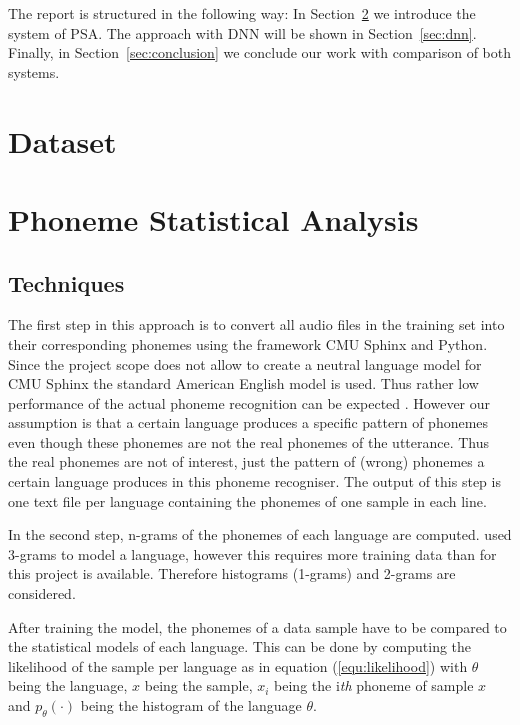 \documentclass{article}
\begin{document}
The report is structured in the following way: In Section~\ref{sec:psa} we introduce the system of PSA. The approach with DNN will be shown in Section~\ref{sec:dnn}. Finally, in Section~\ref{sec:conclusion} we conclude our work with comparison of both systems. 

\section{Dataset}
\label{sec:dataset}

\section{Phoneme Statistical Analysis}
\label{sec:psa}
\subsection{Techniques}
The first step in this approach is to convert all audio files in the training set into their corresponding phonemes using the framework CMU Sphinx \cite{lamere2003cmu} and Python. Since the project scope does not allow to create a neutral language model for CMU Sphinx the standard American English model is used. Thus rather low performance of the actual phoneme recognition can be expected \cite{kepuska2017comparing}. However our assumption is that a certain language produces a specific pattern of phonemes even though these phonemes are not the real phonemes of the utterance. Thus the real phonemes are not of interest, just the pattern of (wrong) phonemes a certain language produces in this phoneme recogniser. The output of this step is one text file per language containing the phonemes of one sample in each line.

In the second step, n-grams of the phonemes of each language are computed. \cite{matejka2005phonotactic} used 3-grams to model a language, however this requires more training data than for this project is available. Therefore histograms (1-grams) and 2-grams are considered.

After training the model, the phonemes of a data sample have to be compared to the statistical models of each language. This can be done by computing the likelihood of the sample per language \cite{matejka2005phonotactic} as in equation (\ref{equ:likelihood}) with $\theta$ being the language, $x$ being the sample, $x_i$ being the i\textit{th} phoneme of sample $x$ and $p_{\theta}(\cdot)$ being the histogram of the language $\theta$.
\end{document}
